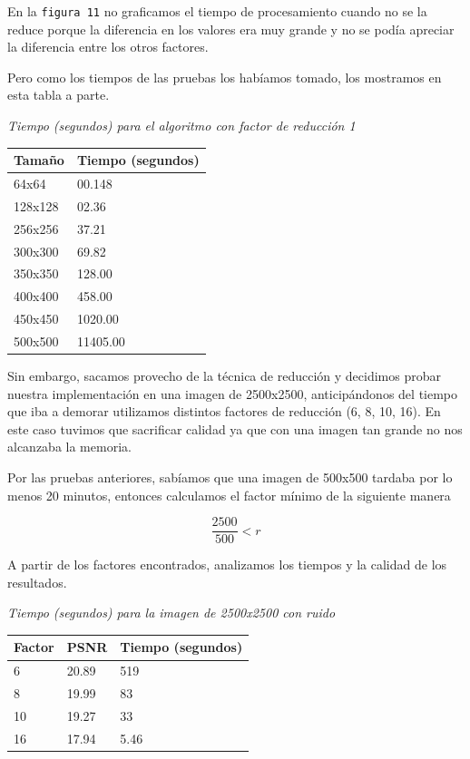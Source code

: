 \documentclass[a4paper]{article}
\begin{document}
En la \texttt{figura 11} no graficamos el tiempo de procesamiento cuando no se la reduce porque la diferencia en los valores era muy grande y no se podía apreciar la diferencia entre los otros factores.

Pero como los tiempos de las pruebas los habíamos tomado, los mostramos en esta tabla a parte.

\vspace{2em}
\textit{Tiempo (segundos) para el algoritmo con factor de reducción 1}
\begin{center}
\begin{tabular}{|l|l|}
  \hline
  Tamaño & Tiempo (segundos) \\
  \hline
64x64 & 00.148 \\
128x128 & 02.36  \\
256x256 & 37.21 \\
300x300 & 69.82 \\
350x350 & 128.00 \\ 
400x400 & 458.00 \\
450x450 & 1020.00 \\
500x500 & 11405.00 \\
\hline
\end{tabular}
\end{center} 
\vspace{1em}

Sin embargo, sacamos provecho de la técnica de reducción y decidimos probar nuestra implementación en una imagen de 2500x2500, anticipándonos del tiempo que iba a demorar utilizamos distintos factores de reducción (6, 8, 10, 16). 
En este caso tuvimos que sacrificar calidad ya que con una imagen tan grande no nos alcanzaba la memoria.

Por las pruebas anteriores, sabíamos que una imagen de 500x500 tardaba por lo menos 20 minutos, entonces calculamos el factor mínimo de la siguiente manera

\begin{equation} \frac{2500}{500} < r\end{equation}

A partir de los factores encontrados, analizamos los tiempos y la calidad de los resultados.

\vspace{2em}
\textit{Tiempo (segundos) para la imagen de 2500x2500 con ruido}
\begin{center}
\begin{tabular}{|l|l|l|}
  \hline
  Factor & PSNR & Tiempo (segundos) \\
  \hline
6  & 20.89 & 519 \\
8  & 19.99 & 83 \\
10 & 19.27 & 33 \\
16 & 17.94 & 5.46 \\
\hline
\end{tabular}
\end{center} 
\vspace{1em}
\end{document}
